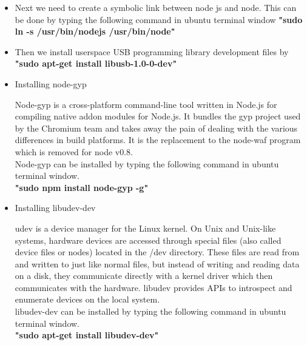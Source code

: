 \documentclass[11pt,a4paper]{article}
\begin{document}
\begin{itemize}
	\item Next we need to create a symbolic link between node js and node. This can be done by typing the following command in ubuntu terminal window 
	\textbf{"sudo ln -s /usr/bin/nodejs /usr/bin/node"}
	\item Then we install userspace USB programming library development files by \\ \textbf{"sudo apt-get install libusb-1.0-0-dev"}
	\item Installing node-gyp 
	\begin{itemize}
	Node-gyp is a cross-platform command-line tool written in Node.js for compiling native addon modules for Node.js. It bundles the gyp project used by the Chromium team and takes away the pain of dealing with the various differences in build platforms. It is the replacement to the node-waf program which is removed for node v0.8.\\
	Node-gyp can be installed by typing the following command in ubuntu terminal window. \\\textbf{"sudo npm install node-gyp -g"}
	\end{itemize}
	\item Installing libudev-dev
	\begin{itemize}
     udev is a device manager for the Linux kernel. On Unix and Unix-like systems, hardware devices are accessed through special files (also called device files or nodes) located in the /dev directory. These files are read from and written to just like normal files, but instead of writing and reading data on a disk, they communicate directly with a kernel driver which then communicates with the hardware. 
     libudev provides APIs to introspect and enumerate devices on the local system.\\
     libudev-dev can be installed by typing the following command in ubuntu terminal window.\\\textbf{ "sudo apt-get install libudev-dev"}
	\end{itemize}


\end{itemize}
\end{document}
